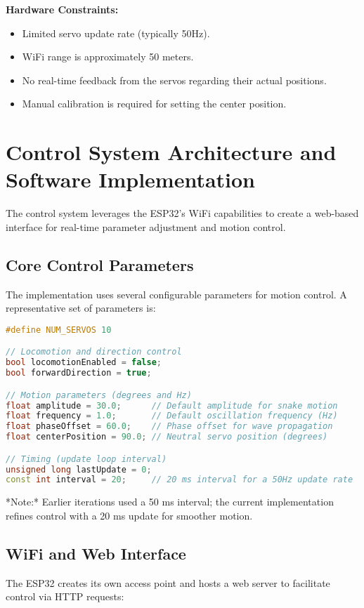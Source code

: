 \documentclass[12pt,a4paper]{report}
\begin{document}
\textbf{Hardware Constraints:}
\begin{itemize}
    \item Limited servo update rate (typically 50Hz).
    \item WiFi range is approximately 50 meters.
    \item No real-time feedback from the servos regarding their actual positions.
    \item Manual calibration is required for setting the center position.
\end{itemize}

\section{Control System Architecture and Software Implementation}
The control system leverages the ESP32’s WiFi capabilities to create a web-based interface for real-time parameter adjustment and motion control.

\subsection{Core Control Parameters}
The implementation uses several configurable parameters for motion control. A representative set of parameters is:

\begin{lstlisting}[language=C++]
#define NUM_SERVOS 10

// Locomotion and direction control
bool locomotionEnabled = false;
bool forwardDirection = true;

// Motion parameters (degrees and Hz)
float amplitude = 30.0;      // Default amplitude for snake motion
float frequency = 1.0;       // Default oscillation frequency (Hz)
float phaseOffset = 60.0;    // Phase offset for wave propagation
float centerPosition = 90.0; // Neutral servo position (degrees)

// Timing (update loop interval)
unsigned long lastUpdate = 0;
const int interval = 20;     // 20 ms interval for a 50Hz update rate
\end{lstlisting}

*Note:* Earlier iterations used a 50 ms interval; the current implementation refines control with a 20 ms update for smoother motion.

\subsection{WiFi and Web Interface}
The ESP32 creates its own access point and hosts a web server to facilitate control via HTTP requests:
\end{document}
